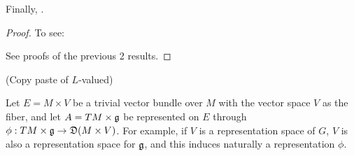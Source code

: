 \begin{theorem}
Finally, .
\end{theorem}


\begin{proof}
To see:

See proofs of the previous 2 results.

\end{proof}


\linea

{\color{gray}(Copy paste of $L$-valued)}

Let $E = M \times V$ be a trivial vector bundle over $M$ with the vector space $V$ as the fiber, and let $A = TM \times \mathfrak{g}$ be represented on $E$ through $\phi: TM \times \alg g \to \alg D(M \times V)$. For example, if $V$ is a representation space of $G$, $V$ is also a representation space for $\mathfrak{g}$, and this induces naturally a representation $\phi$.

